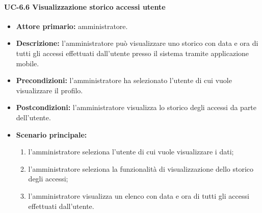     \paragraph{UC-6.6 Visualizzazione storico accessi utente}
    \begin{itemize}
        \item \textbf{Attore primario:} amministratore.
        
        \item \textbf{Descrizione:} l'amministratore può visualizzare uno storico con data e ora di tutti gli accessi effettuati dall'utente presso il sistema tramite applicazione mobile.
        
        \item \textbf{Precondizioni:} l'amministratore ha selezionato l'utente di cui vuole visualizzare il profilo.
    
        \item \textbf{Postcondizioni:} l'amministratore visualizza lo storico degli accessi da parte dell'utente.
    
        \item \textbf{Scenario principale:}
        \begin{enumerate}
            \item  l'amministratore seleziona l'utente di cui vuole visualizzare i dati;
            \item  l'amministratore seleziona la funzionalità di visualizzazione dello storico degli accessi;
            \item l'amministratore visualizza un elenco con data e ora di tutti gli accessi effettuati dall'utente.
        \end{enumerate}
    \end{itemize}

